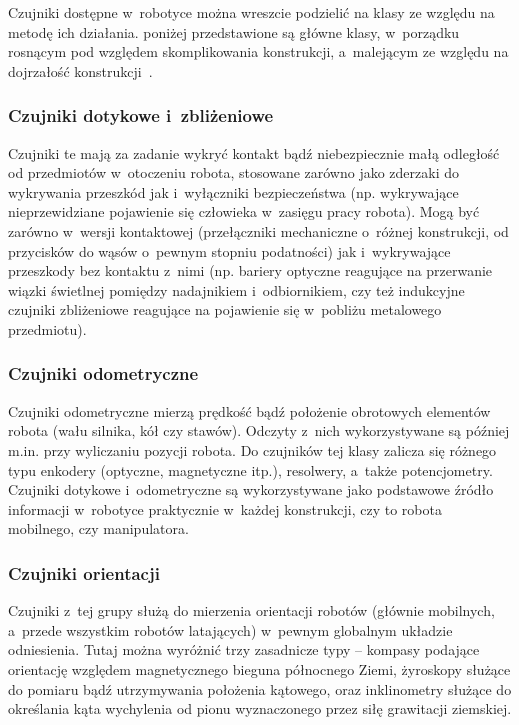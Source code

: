 Czujniki dostępne w~robotyce można wreszcie podzielić na klasy ze względu
na metodę ich działania. poniżej przedstawione są główne klasy, w~porządku
rosnącym pod względem skomplikowania konstrukcji, a~malejącym ze względu na
dojrzałość konstrukcji~\cite{siegwart}.

\subsubsection{Czujniki dotykowe i~zbliżeniowe}

Czujniki te mają za zadanie wykryć kontakt bądź niebezpiecznie małą odległość
od przedmiotów w~otoczeniu robota, stosowane zarówno jako zderzaki do wykrywania
przeszkód jak i~wyłączniki bezpieczeństwa (np. wykrywające nieprzewidziane
pojawienie się człowieka w~zasięgu pracy robota). Mogą być zarówno w~wersji
kontaktowej (przełączniki mechaniczne o~różnej konstrukcji, od przycisków
do wąsów o~pewnym stopniu podatności) jak i~wykrywające przeszkody bez
kontaktu z~nimi (np. bariery optyczne reagujące na przerwanie wiązki świetlnej
pomiędzy nadajnikiem i~odbiornikiem, czy też indukcyjne czujniki zbliżeniowe
reagujące na pojawienie się w~pobliżu metalowego przedmiotu).

\subsubsection{Czujniki odometryczne}

Czujniki odometryczne mierzą prędkość bądź położenie obrotowych elementów
robota (wału silnika, kół czy stawów). Odczyty z~nich wykorzystywane są
później m.in. przy wyliczaniu pozycji robota. Do czujników tej klasy zalicza się
różnego typu enkodery (optyczne, magnetyczne itp.), resolwery, a~także potencjometry.
Czujniki dotykowe i~odometryczne są wykorzystywane jako podstawowe źródło
informacji w~robotyce praktycznie w~każdej konstrukcji, czy to robota mobilnego,
czy manipulatora.

\subsubsection{Czujniki orientacji}

Czujniki z~tej grupy służą do mierzenia orientacji robotów (głównie mobilnych,
a~przede wszystkim robotów latających) w~pewnym globalnym układzie odniesienia.
Tutaj można wyróżnić trzy zasadnicze typy -- kompasy podające orientację
względem magnetycznego bieguna północnego Ziemi, żyroskopy służące do pomiaru
bądź utrzymywania położenia kątowego, oraz inklinometry służące do określania
kąta wychylenia od pionu wyznaczonego przez siłę grawitacji ziemskiej.

